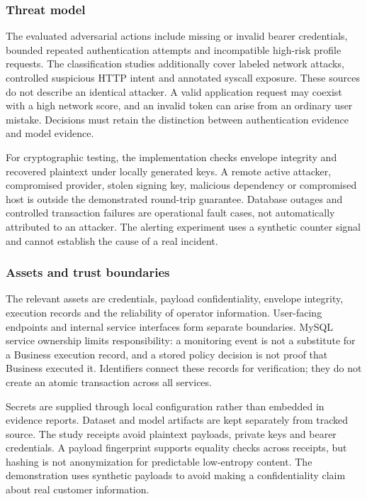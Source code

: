 \documentclass[conference,a4paper]{IEEEtran}
\begin{document}
\subsubsection{Threat model}
The evaluated adversarial actions include missing or invalid bearer credentials, bounded repeated authentication attempts and incompatible high-risk profile requests. The classification studies additionally cover labeled network attacks, controlled suspicious HTTP intent and annotated syscall exposure. These sources do not describe an identical attacker. A valid application request may coexist with a high network score, and an invalid token can arise from an ordinary user mistake. Decisions must retain the distinction between authentication evidence and model evidence.

For cryptographic testing, the implementation checks envelope integrity and recovered plaintext under locally generated keys. A remote active attacker, compromised provider, stolen signing key, malicious dependency or compromised host is outside the demonstrated round-trip guarantee. Database outages and controlled transaction failures are operational fault cases, not automatically attributed to an attacker. The alerting experiment uses a synthetic counter signal and cannot establish the cause of a real incident.

\subsubsection{Assets and trust boundaries}
The relevant assets are credentials, payload confidentiality, envelope integrity, execution records and the reliability of operator information. User-facing endpoints and internal service interfaces form separate boundaries. MySQL service ownership limits responsibility: a monitoring event is not a substitute for a Business execution record, and a stored policy decision is not proof that Business executed it. Identifiers connect these records for verification; they do not create an atomic transaction across all services.

Secrets are supplied through local configuration rather than embedded in evidence reports. Dataset and model artifacts are kept separately from tracked source. The study receipts avoid plaintext payloads, private keys and bearer credentials. A payload fingerprint supports equality checks across receipts, but hashing is not anonymization for predictable low-entropy content. The demonstration uses synthetic payloads to avoid making a confidentiality claim about real customer information.
\end{document}
